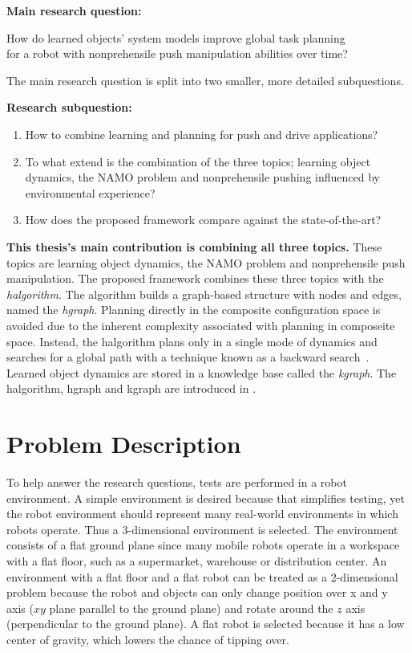 \textbf{Main research question:}
\begin{center}%
\label{researchquestion:main}
\large
How do learned objects' system models improve global task planning\\for a robot with nonprehensile push manipulation abilities over time?
\end{center}

The main research question is split into two smaller, more detailed subquestions.\bs

\textbf{Research subquestion:}
\begin{enumerate}
    \item\label{researchsubquestion:does_it_work} How to combine learning and planning for push and drive applications?
    \item\label{researchsubquestion:does_it_remember} To what extend is the combination of the three topics; learning object dynamics, the \ac{NAMO} problem and nonprehensile pushing influenced by environmental experience?
    \item\label{researchsubquestion:does_it_compare} How does the proposed framework compare against the state-of-the-art?
\end{enumerate}

\textbf{This thesis's main contribution is combining all three topics.} These topics are learning object dynamics, the \ac{NAMO} problem and nonprehensile push manipulation. The proposed framework combines these three topics with the \textit{\acl{halgorithm}}. The algorithm builds a graph-based structure with nodes and edges, named the \textit{\acl{hgraph}}. Planning directly in the composite configuration space is avoided due to the inherent complexity associated with planning in composeite space. Instead, the \acl{halgorithm} plans only in a single mode of dynamics and searches for a global path with a technique known as a backward search~\cite{krontiris_dealing_2015}. Learned object dynamics are stored in a knowledge base called the \textit{\acl{kgraph}}. The \ac{halgorithm}, \ac{hgraph} and \ac{kgraph} are introduced in .\bs

\section{Problem Description}%
\label{sec:problem_description}
To help answer the research questions, tests are performed in a robot environment. A simple environment is desired because that simplifies testing, yet the robot environment should represent many real-world environments in which robots operate. Thus a 3-dimensional environment is selected. The environment consists of a flat ground plane since many mobile robots operate in a workspace with a flat floor, such as a supermarket, warehouse or distribution center. An environment with a flat floor and a flat robot can be treated as a 2-dimensional problem because the robot and objects can only change position over \gls{x} and \gls{y} axis ($xy$ plane parallel to the ground plane) and rotate around the $z$ axis (perpendicular to the ground plane). A flat robot is selected because it has a low center of gravity, which lowers the chance of tipping over.\bs

